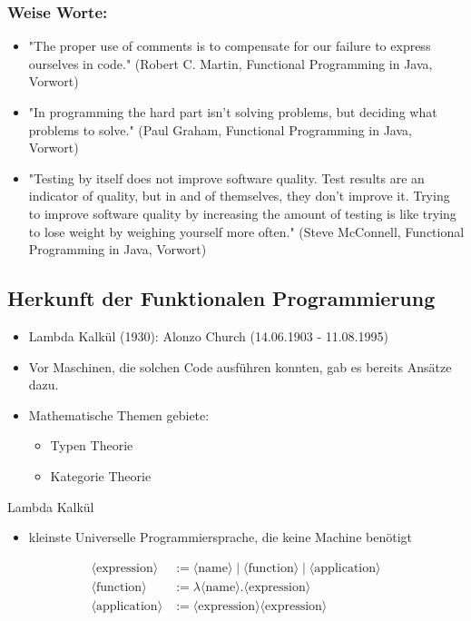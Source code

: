 \documentclass{beamer}
\begin{document}
\begin{frame}
\frametitle{Weise Worte:}
\begin{itemize}
\item \textmd{"The proper use of comments is to compensate for our failure to express ourselves in code." (Robert C. Martin, Functional Programming in Java, Vorwort)}
\item \textmd{"In programming the hard part isn’t solving problems, but deciding what problems to solve." (Paul Graham, Functional Programming in Java, Vorwort)}
\item \textmd{"Testing by itself does not improve software quality. Test results are an indicator of quality, but
in and of themselves, they don’t improve it. Trying to improve software quality by increasing
the amount of testing is like trying to lose weight by weighing yourself more often." (Steve McConnell, Functional Programming in Java, Vorwort)}
\end{itemize}
\end{frame}


\begin{frame}
	\section{Herkunft der Funktionalen Programmierung}
	\begin{itemize}
		\item Lambda Kalkül (1930): Alonzo Church (14.06.1903 - 11.08.1995)
		\item Vor Maschinen, die solchen Code ausführen konnten, gab es bereits Ansätze dazu.
        \item Mathematische Themen gebiete: 
        \begin{itemize}
        	\item Typen Theorie
        	\item Kategorie Theorie
        \end{itemize} 
	\end{itemize}
\end{frame}

\begin{frame}{Lambda Kalkül }
		\begin{itemize}
				\item kleinste Universelle Programmiersprache, die keine Machine benötigt
		\end{itemize}
	\begin{align*}
		\langle \text{expression} \rangle & := \langle \text{name} \rangle \mid \langle \text{function} \rangle \mid \langle \text{application} \rangle \\
		\langle \text{function} \rangle & := \lambda \langle \text{name} \rangle . \langle \text{expression} \rangle \\
		\langle \text{application} \rangle & := \langle \text{expression} \rangle \langle \text{expression} \rangle
	\end{align*}
	\end{frame}
\end{document}
